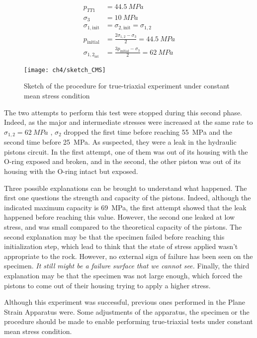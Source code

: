 \begin{align}
    p_{TT1} &= \SI{44.5}{MPa}\\
    \sigma_3 &= \SI{10}{MPa}\\
    \sigma_{1,\text{init}} &= \sigma_{2,\text{init}} = \sigma_{1,2} \\
    p_\text{initial} &= \frac{2\sigma_{1,2}-\sigma_3}{2} = \SI{44.5}{MPa}\\
    \sigma_{1,2_{\text{int}}} &= \frac{3p_\text{initial}-\sigma_3}{2} = \SI{62}{MPa}
\end{align}

\begin{figure}[tb]
    \centering
    \texttt{[image: ch4/sketch\_CMS]}
    \caption{Sketch of the procedure for true-triaxial experiment under constant mean stress condition}
    \label{fig4:16}
\end{figure} 

The two attempts to perform this test were stopped during this second phase. Indeed, as the major and intermediate stresses were increased at the same rate to $\sigma_{1,2} = \SI{62}{MPa}$ , $\sigma_2$ dropped the first time before reaching \SI{55}{MPa} and the second time before \SI{25}{MPa}. As suspected, they were a leak in the hydraulic pistons circuit. In the first attempt, one of them was out of its housing with the O-ring exposed and broken, and in the second, the other piston was out of its housing with the O-ring intact but exposed. 

Three possible explanations can be brought to understand what happened. The first one questions the strength and capacity of the pistons. Indeed, although the indicated maximum capacity is \SI{69}{MPa}, the first attempt showed that the leak happened before reaching this value. However, the second one leaked at low stress, and was small compared to the theoretical capacity of the pistons. The second explanation may be that the specimen failed before reaching this initialization step, which lead to think that the state of stress applied wasn’t appropriate to the rock. However, no external sign of failure has been seen on the specimen. \emph{It still might be a failure surface that we cannot see.} Finally, the third explanation may be that the specimen was not large enough, which forced the pistons to come out of their housing trying to apply a higher stress.

Although this experiment was successful, previous ones performed in the Plane Strain Apparatus were. Some adjustments of the apparatus, the specimen or the procedure should be made to enable performing true-triaxial tests under constant mean stress condition. 